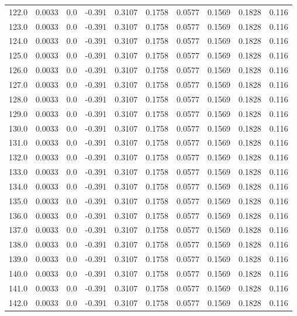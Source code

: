 \begin{longtable}{lrrrrrrrrr}
122.0 & 0.0033 & 0.0 & -0.391 & 0.3107 & 0.1758 & 0.0577 & 0.1569 & 0.1828 & 0.116 \\
123.0 & 0.0033 & 0.0 & -0.391 & 0.3107 & 0.1758 & 0.0577 & 0.1569 & 0.1828 & 0.116 \\
124.0 & 0.0033 & 0.0 & -0.391 & 0.3107 & 0.1758 & 0.0577 & 0.1569 & 0.1828 & 0.116 \\
125.0 & 0.0033 & 0.0 & -0.391 & 0.3107 & 0.1758 & 0.0577 & 0.1569 & 0.1828 & 0.116 \\
126.0 & 0.0033 & 0.0 & -0.391 & 0.3107 & 0.1758 & 0.0577 & 0.1569 & 0.1828 & 0.116 \\
127.0 & 0.0033 & 0.0 & -0.391 & 0.3107 & 0.1758 & 0.0577 & 0.1569 & 0.1828 & 0.116 \\
128.0 & 0.0033 & 0.0 & -0.391 & 0.3107 & 0.1758 & 0.0577 & 0.1569 & 0.1828 & 0.116 \\
129.0 & 0.0033 & 0.0 & -0.391 & 0.3107 & 0.1758 & 0.0577 & 0.1569 & 0.1828 & 0.116 \\
130.0 & 0.0033 & 0.0 & -0.391 & 0.3107 & 0.1758 & 0.0577 & 0.1569 & 0.1828 & 0.116 \\
131.0 & 0.0033 & 0.0 & -0.391 & 0.3107 & 0.1758 & 0.0577 & 0.1569 & 0.1828 & 0.116 \\
132.0 & 0.0033 & 0.0 & -0.391 & 0.3107 & 0.1758 & 0.0577 & 0.1569 & 0.1828 & 0.116 \\
133.0 & 0.0033 & 0.0 & -0.391 & 0.3107 & 0.1758 & 0.0577 & 0.1569 & 0.1828 & 0.116 \\
134.0 & 0.0033 & 0.0 & -0.391 & 0.3107 & 0.1758 & 0.0577 & 0.1569 & 0.1828 & 0.116 \\
135.0 & 0.0033 & 0.0 & -0.391 & 0.3107 & 0.1758 & 0.0577 & 0.1569 & 0.1828 & 0.116 \\
136.0 & 0.0033 & 0.0 & -0.391 & 0.3107 & 0.1758 & 0.0577 & 0.1569 & 0.1828 & 0.116 \\
137.0 & 0.0033 & 0.0 & -0.391 & 0.3107 & 0.1758 & 0.0577 & 0.1569 & 0.1828 & 0.116 \\
138.0 & 0.0033 & 0.0 & -0.391 & 0.3107 & 0.1758 & 0.0577 & 0.1569 & 0.1828 & 0.116 \\
139.0 & 0.0033 & 0.0 & -0.391 & 0.3107 & 0.1758 & 0.0577 & 0.1569 & 0.1828 & 0.116 \\
140.0 & 0.0033 & 0.0 & -0.391 & 0.3107 & 0.1758 & 0.0577 & 0.1569 & 0.1828 & 0.116 \\
141.0 & 0.0033 & 0.0 & -0.391 & 0.3107 & 0.1758 & 0.0577 & 0.1569 & 0.1828 & 0.116 \\
142.0 & 0.0033 & 0.0 & -0.391 & 0.3107 & 0.1758 & 0.0577 & 0.1569 & 0.1828 & 0.116 \\

\end{longtable}
